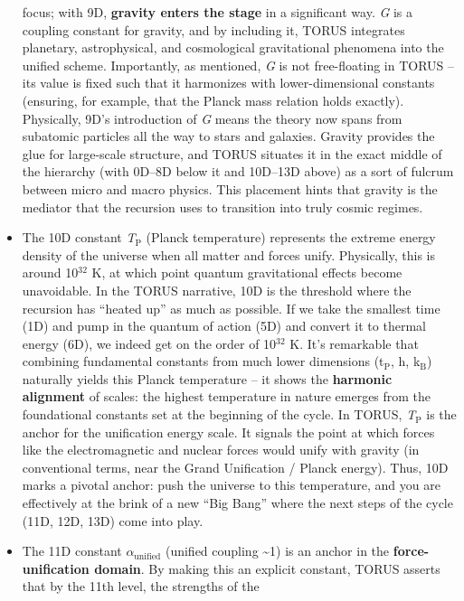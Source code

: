 \documentclass[]{article}
\newcommand{\subscript}[1]{\ensuremath{_{\mathrm{#1}}}}
\newcommand{\superscript}[1]{\ensuremath{^{\mathrm{#1}}}}
\begin{document}
\begin{itemize}
  focus; with 9D, \textbf{gravity enters the stage} in a significant
  way. \emph{G} is a coupling constant for gravity, and by including it,
  TORUS integrates planetary, astrophysical, and cosmological
  gravitational phenomena into the unified scheme. Importantly, as
  mentioned, \emph{G} is not free-floating in TORUS -- its value is
  fixed such that it harmonizes with lower-dimensional constants
  (ensuring, for example, that the Planck mass relation holds exactly)​.
  Physically, 9D's introduction of \emph{G} means the theory now spans
  from subatomic particles all the way to stars and galaxies. Gravity
  provides the glue for large-scale structure, and TORUS situates it in
  the exact middle of the hierarchy (with 0D--8D below it and 10D--13D
  above) as a sort of fulcrum between micro and macro physics. This
  placement hints that gravity is the mediator that the recursion uses
  to transition into truly cosmic regimes.
\item
  The 10D constant
  \emph{T\subscript{P}}
  (Planck temperature) represents the extreme energy density of the
  universe when all matter and forces unify. Physically, this is around
  10\superscript{32} K, at which point quantum gravitational effects become
  unavoidable. In the TORUS narrative, 10D is the threshold where the
  recursion has ``heated up'' as much as possible​. If we take the
  smallest time (1D) and pump in the quantum of action (5D) and convert
  it to thermal energy (6D), we indeed get on the order of 10\superscript{32} K​.
  It's remarkable that combining fundamental constants from much lower
  dimensions
  (t\subscript{P}, h,
  k\subscript{B}) naturally
  yields this Planck temperature -- it shows the \textbf{harmonic
  alignment} of scales: the highest temperature in nature emerges from
  the foundational constants set at the beginning of the
  cycle​. In TORUS,
  \emph{T\subscript{P}} is
  the anchor for the unification energy scale. It signals the point at
  which forces like the electromagnetic and nuclear forces would unify
  with gravity (in conventional terms, near the Grand Unification /
  Planck energy). Thus, 10D marks a pivotal anchor: push the universe to
  this temperature, and you are effectively at the brink of a new ``Big
  Bang'' where the next steps of the cycle (11D, 12D, 13D) come into
  play.
\item
  The 11D constant
  $\alpha_\text{unified}$
  (unified coupling \textasciitilde{}1) is an anchor in the
  \textbf{force-unification domain}. By making this an explicit
  constant, TORUS asserts that by the 11th level, the strengths of the

\end{itemize}
\end{document}
